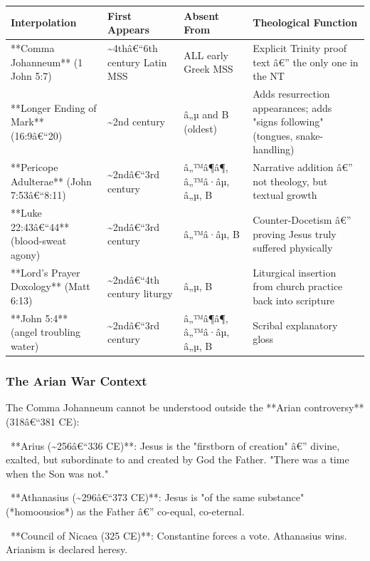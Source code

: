 \documentclass[aps,prd,11pt,onecolumn,superscriptaddress,nofootinbib,floatfix]{revtex4-2}
\begin{document}
\begin{table}[h!]
\centering
\begin{tabular}{p{3cm}p{3cm}p{3cm}p{3cm}}
\hline
Interpolation & First Appears & Absent From & Theological Function \\
\hline
**Comma Johanneum** (1 John 5:7) & \textasciitilde{}4thâ€``6th century Latin MSS & ALL early Greek MSS & Explicit Trinity proof text â€'' the only one in the NT \\
**Longer Ending of Mark** (16:9â€``20) & \textasciitilde{}2nd century & â„µ and B (oldest) & Adds resurrection appearances; adds "signs following" (tongues, snake-handling) \\
**Pericope Adulterae** (John 7:53â€``8:11) & \textasciitilde{}2ndâ€``3rd century & â„™â¶â¶, â„™â·âµ, â„µ, B & Narrative addition â€'' not theology, but textual growth \\
**Luke 22:43â€``44** (blood-sweat agony) & \textasciitilde{}2ndâ€``3rd century & â„™â·âµ, B & Counter-Docetism â€'' proving Jesus truly suffered physically \\
**Lord's Prayer Doxology** (Matt 6:13) & \textasciitilde{}2ndâ€``4th century liturgy & â„µ, B & Liturgical insertion from church practice back into scripture \\
**John 5:4** (angel troubling water) & \textasciitilde{}2ndâ€``3rd century & â„™â¶â¶, â„™â·âµ, â„µ, B & Scribal explanatory gloss \\
\hline
\end{tabular}
\end{table}



\subsubsection{The Arian War Context}


The Comma Johanneum cannot be understood outside the **Arian controversy** (318â€``381 CE):


\textbullet~**Arius (\textasciitilde{}256â€``336 CE)**: Jesus is the "firstborn of creation" â€'' divine, exalted, but subordinate to and created by God the Father. "There was a time when the Son was not."

\textbullet~**Athanasius (\textasciitilde{}296â€``373 CE)**: Jesus is "of the same substance" (*homoousios*) as the Father â€'' co-equal, co-eternal.

\textbullet~**Council of Nicaea (325 CE)**: Constantine forces a vote. Athanasius wins. Arianism is declared heresy.
\end{document}
